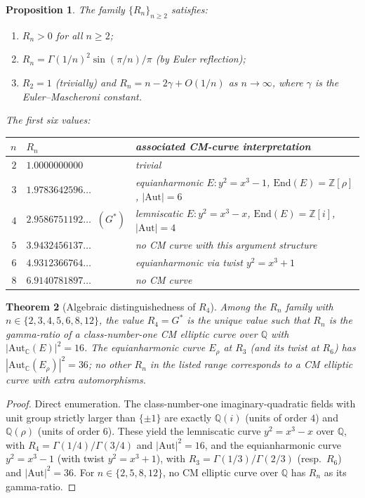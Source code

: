 \documentclass[11pt]{article}
\newtheorem{theorem}{Theorem}[section]
\newtheorem{proposition}[theorem]{Proposition}
\theoremstyle{definition}
\theoremstyle{remark}
\newcommand{\Gs}{G^{*}}
\newcommand{\Z}{\mathbb{Z}}
\newcommand{\Q}{\mathbb{Q}}
\newcommand{\C}{\mathbb{C}}
\newcommand{\Aut}{\mathrm{Aut}}
\begin{document}
\begin{proposition}\label{prop:Rn-family}
The family $\{R_n\}_{n \geq 2}$ satisfies:
\begin{enumerate}[label=\textup{(\roman*)}, leftmargin=*, itemsep=2pt]
\item $R_n > 0$ for all $n \geq 2$;
\item $R_n = \Gamma(1/n)^2 \sin(\pi/n)/\pi$ (by Euler reflection);
\item $R_2 = 1$ (trivially) and $R_n = n - 2\gamma + O(1/n)$ as $n \to \infty$,
where $\gamma$ is the Euler--Mascheroni constant.
\end{enumerate}
The first six values:
\begin{center}
\begin{tabular}{rl@{\qquad}l}
\toprule
$n$ & $R_n$ & associated CM-curve interpretation \\
\midrule
$2$ & $1.0000000000$  & trivial \\
$3$ & $1.9783642596\ldots$ & equianharmonic $E: y^2 = x^3 - 1$, $\mathrm{End}(E) = \Z[\rho]$, $|\Aut| = 6$ \\
$4$ & $2.9586751192\ldots\;\;(\Gs)$ & lemniscatic $E: y^2 = x^3 - x$, $\mathrm{End}(E) = \Z[i]$, $|\Aut| = 4$ \\
$5$ & $3.9432456137\ldots$ & no CM curve with this argument structure \\
$6$ & $4.9312366764\ldots$ & equianharmonic via twist $y^2 = x^3 + 1$ \\
$8$ & $6.9140781897\ldots$ & no CM curve \\
\bottomrule
\end{tabular}
\end{center}
\end{proposition}

\begin{theorem}[Algebraic distinguishedness of $R_4$]\label{thm:R4-distinguished}
Among the $R_n$ family with $n \in \{2, 3, 4, 5, 6, 8, 12\}$, the value
$R_4 = \Gs$ is the unique value such that $R_n$ is the gamma-ratio of a
class-number-one CM elliptic curve over $\Q$ with $|\Aut_{\C}(E)|^{2} = 16$.
The equianharmonic curve $E_\rho$ at $R_3$ (and its twist at $R_6$) has
$|\Aut_{\C}(E_\rho)|^{2} = 36$; no other $R_n$ in the listed range
corresponds to a CM elliptic curve with extra automorphisms.
\end{theorem}

\begin{proof}
Direct enumeration. The class-number-one imaginary-quadratic fields with
unit group strictly larger than $\{\pm 1\}$ are exactly $\Q(i)$ (units of
order $4$) and $\Q(\rho)$ (units of order $6$). These yield the
lemniscatic curve $y^2 = x^3 - x$ over $\Q$, with $R_4 = \Gamma(1/4)/\Gamma(3/4)$
and $|\Aut|^{2} = 16$, and the equianharmonic curve $y^2 = x^3 - 1$ (with
twist $y^2 = x^3 + 1$), with $R_3 = \Gamma(1/3)/\Gamma(2/3)$ (resp.\ $R_6$)
and $|\Aut|^{2} = 36$. For $n \in \{2, 5, 8, 12\}$, no CM elliptic curve
over $\Q$ has $R_n$ as its gamma-ratio.
\end{proof}
\end{document}
